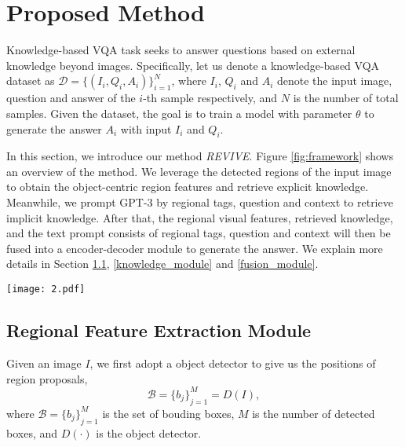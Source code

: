 \documentclass{article}
\begin{document}
\section{Proposed Method \label{sec:method}}

Knowledge-based VQA task \cite{marino2019ok} seeks to answer questions based on external knowledge beyond images. Specifically, let us denote a knowledge-based VQA dataset as $\mathcal{D} = \{(I_{i}, Q_{i}, A_{i})\}^{N}_{i=1} $, where $I_{i}$, $Q_{i}$ and $A_{i}$ denote the input image, question and answer of the $i$-th sample respectively, and $N$ is the number of total samples. Given the dataset, the goal is to train a model with parameter $\theta$ to generate the answer $A_{i}$ with input $I_{i}$ and $Q_{i}$. 

In this section, we introduce our method \emph{REVIVE}. Figure \ref{fig:framework} shows an overview of the method. We leverage the detected regions of the input image to obtain the object-centric region features and retrieve explicit knowledge. Meanwhile, we prompt GPT-3 \cite{brown2020language} by regional tags, question and context to retrieve implicit knowledge. After that, the regional visual features, retrieved  knowledge, and the text prompt consists of regional tags, question and context will then be fused into a encoder-decoder module to generate the answer. We explain more details in Section \ref{region_module}, \ref{knowledge_module} and \ref{fusion_module}.

\begin{figure*}
\begin{center}
\texttt{[image: 2.pdf]}
\end{center}
    \vspace{-2mm}
   \caption{\textbf{The illustration of \textit{REVIVE.}} It exploits regional information (\textit{i.e.}, features, positions and tags), question and context to retrieve different types of knowledge. In addition, it also incorporates learned object-centric region features with retrieved knowledge for answer generation.}
    \vspace{-2mm}
\label{fig:framework}
\end{figure*}

\subsection{Regional Feature Extraction Module}
\label{region_module}
Given an image $I$, we first adopt a object detector to give us the positions of region proposals,
\begin{equation}
    \mathcal{B}={\{b_{j}\}}_{j=1}^{M} = D(I),
\end{equation}
where $\mathcal{B}={\{b_{j}\}}_{j=1}^{M}$ is the set of bouding boxes, $M$ is the number of detected boxes, and $D(\cdot)$ is the object detector.
\end{document}
